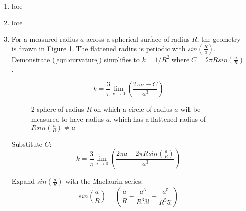 \documentclass{paper}
\begin{document}
\begin{enumerate}
    \item %
      lore

    \item %
      lore

   \item %
     For a measured radius $a$ across a spherical surface of radius $R$,
     the geometry is drawn in Figure \ref{fig:sphere}. The flattened radius
     is periodic with $sin \left(\frac{R}{a}\right)$. Demonstrate 
     (\ref{eqn:curvature}) simplifies to $k = 1/R^2$ where 
     $C=2 \pi R sin \left(\frac{a}{R}\right)$.

     \begin{equation}
       k = \frac{3}{\pi} \lim_{a \to 0} \left( \frac{2 \pi a - C}{a^3} \right)
       \label{eqn:curvature}
     \end{equation}

     \begin{figure}[!htb]


       \caption{2-sphere of radius $R$ on which a circle of radius $a$ will be
         measured to have radius $a$, which has a flattened radius of
         $R sin \left( \frac{a}{R} \right) \neq a$}
       \label{fig:sphere}
     \end{figure}

     Substitute $C$:
       \[ k = \frac{3}{\pi} \lim_{a \to 0} \left( \frac{2 \pi a - 
         2 \pi R sin \left(\frac{a}{R}\right)}{a^3} \right) \]

     Expand $sin \left(\frac{a}{R}\right)$ with the Maclaurin series:
       \[ sin \left(\frac{a}{R}\right) = \left( \frac{a}{R} 
         - \frac{a^3}{R^3 3!} + \frac{a^5}{R^5 5!} \right) \]


\end{enumerate}
\end{document}
